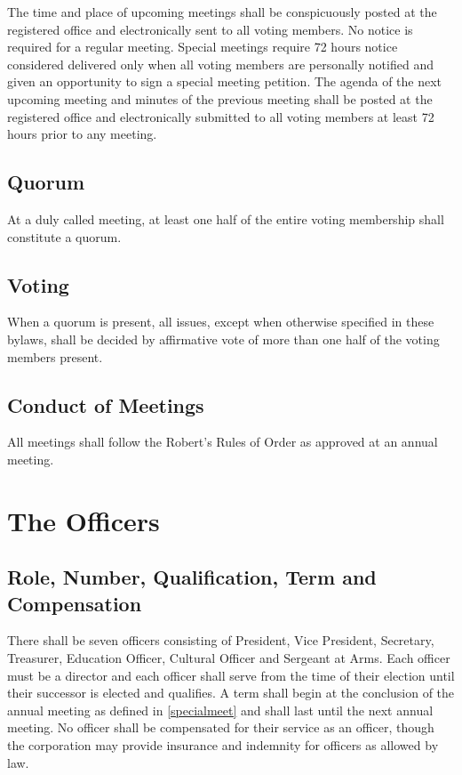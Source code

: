 \documentclass[10pt,letterpaper,titlepage]{article}
\begin{document}
The time and place of upcoming meetings shall be conspicuously posted at the
registered office and electronically sent to all voting members.
No notice is required for a regular meeting.
Special meetings require 72 hours notice considered delivered only when all
voting members are personally notified and given an opportunity to sign a
special meeting petition.
The agenda of the next upcoming meeting and minutes of the previous meeting
shall be posted at the registered office and electronically submitted to all
voting members at least 72 hours prior to any meeting.

\subsection{Quorum}

At a duly called meeting, at least one half of the entire voting
membership shall constitute a quorum.

\subsection{Voting}

When a quorum is present, all issues, except when otherwise specified in these
bylaws, shall be decided by affirmative vote of more than one half of the
voting members present.

\subsection{Conduct of Meetings}
\label{condofmeet}

All meetings shall follow the Robert's Rules of Order as approved at an annual
meeting.


\section{The Officers}
\label{officers}

\subsection{Role, Number, Qualification, Term and Compensation}

There shall be seven officers consisting of President, Vice President,
Secretary, Treasurer, Education Officer, Cultural Officer and Sergeant at Arms.
Each officer must be a director and each officer shall serve from the time of
their election until their successor is elected and qualifies.
A term shall begin at the conclusion of the annual meeting as defined in
\ref{specialmeet} and shall last until the next annual meeting.
No officer shall be compensated for their service as an officer, though the
corporation may provide insurance and indemnity for officers as allowed by law.
\end{document}
